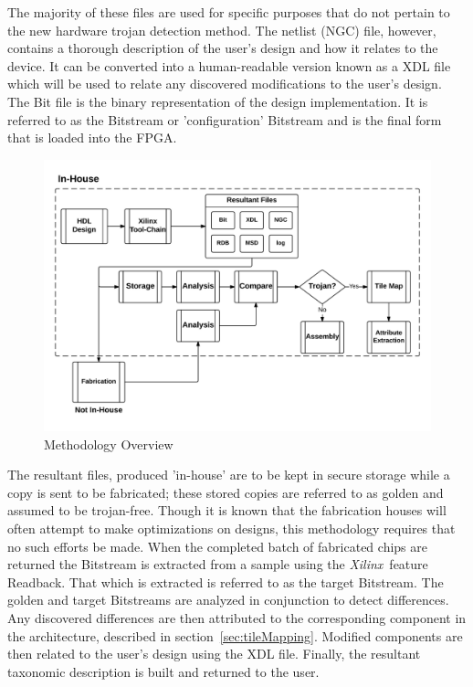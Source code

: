 \documentclass[conference]{IEEEtran}
\newcommand{\Xilinx}{\textit{\gls{Xilinx}}~}
\begin{document}
The majority of these files are used for specific purposes that do not pertain to the new hardware trojan detection method.
The netlist (NGC) file, however, contains a thorough description of the user's design and how it relates to the device.
It can be converted into a human-readable version known as a \acrfull{XDL} file which will be used to relate any discovered modifications to the user's design.
The Bit file is the binary representation of the design implementation.
It is referred to as the \gls{Bitstream} or 'configuration' \gls{Bitstream} and is the final form that is loaded into the \acrshort{FPGA}.
\begin{figure}
	\centering
	\includegraphics[width=1\linewidth]{../Thesis/Figures/methodologyOverview}
	\caption[Methodology Overview]{Methodology Overview}
	\label{fig:methodologyOverview}
\end{figure}
The resultant files, produced 'in-house' are to be kept in secure storage while a copy is sent to be fabricated; these stored copies are referred to as \gls{golden} and assumed to be trojan-free.
Though it is known that the fabrication houses will often attempt to make optimizations on designs, this methodology requires that no such efforts be made.
When the completed batch of fabricated chips are returned the \gls{Bitstream} is extracted from a sample using the \Xilinx feature \gls{Readback}. 
That which is extracted is referred to as the \gls{target} \gls{Bitstream}.
The \gls{golden} and \gls{target} \gls{Bitstream}s are analyzed in conjunction to detect differences.
Any discovered differences are then attributed to the corresponding component in the architecture, described in section~\ref{sec:tileMapping}.
Modified components are then related to the user's design using the \acrshort{XDL} file.
Finally, the resultant taxonomic description is built and returned to the user.
\end{document}
